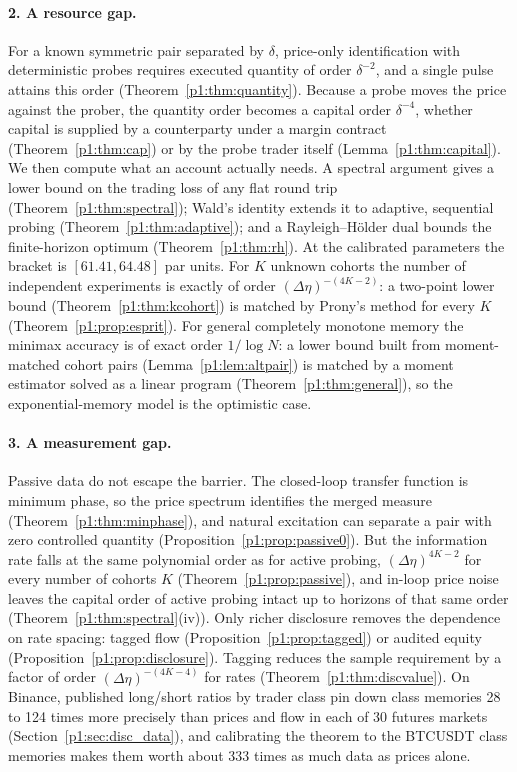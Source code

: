 \paragraph{2. A resource gap.} For a known symmetric pair separated by $\delta$, price-only identification with deterministic probes requires executed quantity of order $\delta^{-2}$, and a single pulse attains this order (Theorem~\ref{p1:thm:quantity}). Because a probe moves the price against the prober, the quantity order becomes a capital order $\delta^{-4}$, whether capital is supplied by a counterparty under a margin contract (Theorem~\ref{p1:thm:cap}) or by the probe trader itself (Lemma~\ref{p1:thm:capital}). We then compute what an account actually needs. A spectral argument gives a lower bound on the trading loss of any flat round trip (Theorem~\ref{p1:thm:spectral}); Wald's identity extends it to adaptive, sequential probing (Theorem~\ref{p1:thm:adaptive}); and a Rayleigh--H\"older dual bounds the finite-horizon optimum (Theorem~\ref{p1:thm:rh}). At the calibrated parameters the bracket is $[61.41, 64.48]$ par units. For $K$ unknown cohorts the number of independent experiments is exactly of order $(\Delta\eta)^{-(4K-2)}$: a two-point lower bound (Theorem~\ref{p1:thm:kcohort}) is matched by Prony's method for every $K$ (Theorem~\ref{p1:prop:esprit}). For general completely monotone memory the minimax accuracy is of exact order $1/\log N$: a lower bound built from moment-matched cohort pairs (Lemma~\ref{p1:lem:altpair}) is matched by a moment estimator solved as a linear program (Theorem~\ref{p1:thm:general}), so the exponential-memory model is the optimistic case.

\paragraph{3. A measurement gap.} Passive data do not escape the barrier. The closed-loop transfer function is minimum phase, so the price spectrum identifies the merged measure (Theorem~\ref{p1:thm:minphase}), and natural excitation can separate a pair with zero controlled quantity (Proposition~\ref{p1:prop:passive0}). But the information rate falls at the same polynomial order as for active probing, $(\Delta\eta)^{4K-2}$ for every number of cohorts $K$ (Theorem~\ref{p1:prop:passive}), and in-loop price noise leaves the capital order of active probing intact up to horizons of that same order (Theorem~\ref{p1:thm:spectral}(iv)). Only richer disclosure removes the dependence on rate spacing: tagged flow (Proposition~\ref{p1:prop:tagged}) or audited equity (Proposition~\ref{p1:prop:disclosure}). Tagging reduces the sample requirement by a factor of order $(\Delta\eta)^{-(4K-4)}$ for rates (Theorem~\ref{p1:thm:discvalue}). On Binance, published long/short ratios by trader class pin down class memories 28 to 124 times more precisely than prices and flow in each of 30 futures markets (Section~\ref{p1:sec:disc_data}), and calibrating the theorem to the BTCUSDT class memories makes them worth about 333 times as much data as prices alone.

